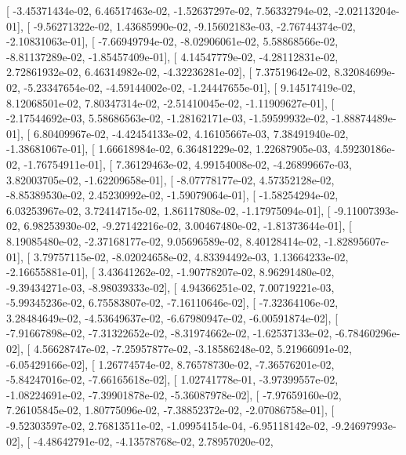 \documentclass{article}
\begin{document}
       [ -3.45371434e-02,   6.46517463e-02,  -1.52637297e-02,
          7.56332794e-02,  -2.02113204e-01],
       [ -9.56271322e-02,   1.43685990e-02,  -9.15602183e-03,
         -2.76744374e-02,  -2.10831063e-01],
       [ -7.66949794e-02,  -8.02906061e-02,   5.58868566e-02,
         -8.81137289e-02,  -1.85457409e-01],
       [  4.14547779e-02,  -4.28112831e-02,   2.72861932e-02,
          6.46314982e-02,  -4.32236281e-02],
       [  7.37519642e-02,   8.32084699e-02,  -5.23347654e-02,
         -4.59144002e-02,  -1.24447655e-01],
       [  9.14517419e-02,   8.12068501e-02,   7.80347314e-02,
         -2.51410045e-02,  -1.11909627e-01],
       [ -2.17544692e-03,   5.58686563e-02,  -1.28162171e-03,
         -1.59599932e-02,  -1.88874489e-01],
       [  6.80409967e-02,  -4.42454133e-02,   4.16105667e-03,
          7.38491940e-02,  -1.38681067e-01],
       [  1.66618984e-02,   6.36481229e-02,   1.22687905e-03,
          4.59230186e-02,  -1.76754911e-01],
       [  7.36129463e-02,   4.99154008e-02,  -4.26899667e-03,
          3.82003705e-02,  -1.62209658e-01],
       [ -8.07778177e-02,   4.57352128e-02,  -8.85389530e-02,
          2.45230992e-02,  -1.59079064e-01],
       [ -1.58254294e-02,   6.03253967e-02,   3.72414715e-02,
          1.86117808e-02,  -1.17975094e-01],
       [ -9.11007393e-02,   6.98253930e-02,  -9.27142216e-02,
          3.00467480e-02,  -1.81373644e-01],
       [  8.19085480e-02,  -2.37168177e-02,   9.05696589e-02,
          8.40128414e-02,  -1.82895607e-01],
       [  3.79757115e-02,  -8.02024658e-02,   4.83394492e-03,
          1.13664233e-02,  -2.16655881e-01],
       [  3.43641262e-02,  -1.90778207e-02,   8.96291480e-02,
         -9.39434271e-03,  -8.98039333e-02],
       [  4.94366251e-02,   7.00719221e-03,  -5.99345236e-02,
          6.75583807e-02,  -7.16110646e-02],
       [ -7.32364106e-02,   3.28484649e-02,  -4.53649637e-02,
         -6.67980947e-02,  -6.00591874e-02],
       [ -7.91667898e-02,  -7.31322652e-02,  -8.31974662e-02,
         -1.62537133e-02,  -6.78460296e-02],
       [  4.56628747e-02,  -7.25957877e-02,  -3.18586248e-02,
          5.21966091e-02,  -6.05429166e-02],
       [  1.26774574e-02,   8.76578730e-02,  -7.36576201e-02,
         -5.84247016e-02,  -7.66165618e-02],
       [  1.02741778e-01,  -3.97399557e-02,  -1.08224691e-02,
         -7.39901878e-02,  -5.36087978e-02],
       [ -7.97659160e-02,   7.26105845e-02,   1.80775096e-02,
         -7.38852372e-02,  -2.07086758e-01],
       [ -9.52303597e-02,   2.76813511e-02,  -1.09954154e-04,
         -6.95118142e-02,  -9.24697993e-02],
       [ -4.48642791e-02,  -4.13578768e-02,   2.78957020e-02,
\end{document}

